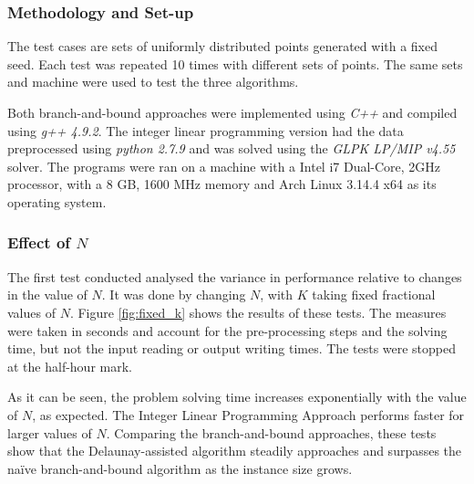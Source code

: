 \subsubsection*{Methodology and Set-up}
The test cases are sets of uniformly distributed points generated with a fixed seed. Each test was repeated 10 times with different sets of points. The same sets and machine were used to test the three algorithms.

Both branch-and-bound approaches were implemented using \emph{C++} and compiled using \emph{g++ 4.9.2}. The integer linear programming version had the data preprocessed using \emph{python 2.7.9} and was solved using the \emph{GLPK LP/MIP v4.55} solver. The programs were ran on a machine with a Intel i7 Dual-Core, 2GHz processor, with a 8 GB, 1600 MHz memory and Arch Linux 3.14.4 x64 as its operating system.

\subsubsection*{Effect of $N$}

The first test conducted analysed the variance in performance relative to changes in the value of $N$. It was done by changing $N$, with $K$ taking fixed fractional values of $N$. Figure \ref{fig:fixed_k} shows the results of these tests. The measures were taken in seconds and account for the pre-processing steps and the solving time, but not the input reading or output writing times. The tests were stopped at the half-hour mark. 

\noindent
As it can be seen, the problem solving time increases exponentially with the value of $N$, as expected.
The Integer Linear Programming Approach performs faster for larger values of $N$. Comparing the branch-and-bound approaches, these tests show that the Delaunay-assisted algorithm steadily approaches and surpasses the naïve branch-and-bound algorithm as the instance size grows.
